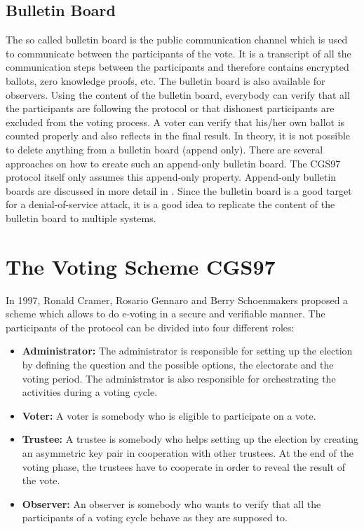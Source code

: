 \documentclass[numbers=noenddot, abstract=on, a4paper, headsepline,
footsepline, oneside, draft=off]{scrreprt}
\begin{document}
\subsection{Bulletin Board}
\label{sec:bulletinboard}
The so called bulletin board is the public communication channel which is used
to communicate between the participants of the vote. It is a
transcript of all the communication steps between the participants and therefore
contains encrypted ballots, zero knowledge proofs, etc. The bulletin board is
also available for observers. Using the content of the bulletin board, everybody
can verify that all the participants are following the protocol or that
dishonest participants are excluded from the voting process. A voter can verify
that his/her own ballot is counted properly and also reflects in the final
result. In theory, it is not possible to delete anything from a bulletin board
(append only). There are several approaches on how to create such an
append-only bulletin board. The CGS97 protocol itself only assumes this
append-only property. Append-only bulletin boards are discussed in more detail
in \cite{HL09}. Since the bulletin board is a good target for a
denial-of-service attack, it is a good idea to replicate the content of the bulletin board to multiple systems.


\section{The Voting Scheme CGS97}
\label{sec:CGS97}
In 1997, Ronald Cramer, Rosario Gennaro and Berry Schoenmakers proposed a scheme
\cite{CGS97} which allows to do e-voting in a secure and verifiable manner. The participants of
the protocol can be divided into four different roles:
\begin{itemize}
  \item \textbf{Administrator:} The administrator is responsible for setting up
  the election by defining the question and the possible options, the
  electorate and the voting period. The administrator is also responsible for
  orchestrating the activities during a voting cycle.
  \item \textbf{Voter:} A voter is somebody who is eligible to participate on
  a vote. 
  \item \textbf{Trustee:} A trustee is somebody who helps setting up the
  election by creating an asymmetric key pair in cooperation with other
  trustees.
  At the end of the voting phase, the trustees have to cooperate in order to
  reveal the result of the vote.
  \item \textbf{Observer:} An observer is somebody who wants to verify that all
  the participants of a voting cycle behave as they are supposed to.
\end{itemize}
\end{document}
